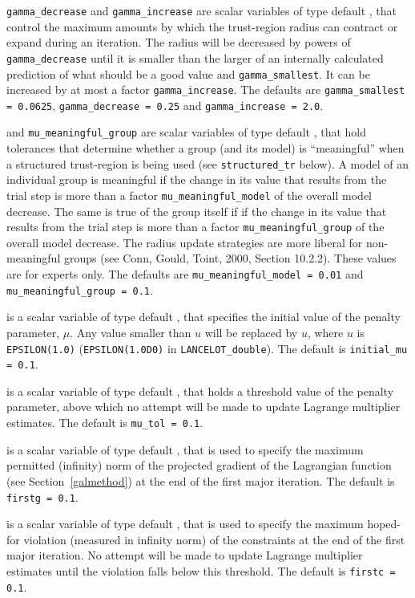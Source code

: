 \documentclass{galahad}
\newcommand{\fullpackagename}{LANC\-E\-LOT}
\begin{document}
\begin{description}
 {\tt gamma\_decrease} and
{\tt gamma\_increase} are scalar variables of type default \realdp, that
control the maximum amounts by which the trust-region radius can
contract or expand during an iteration. The radius will be decreased by
powers of {\tt gamma\_decrease} until it is smaller than the larger
of an internally calculated prediction of what should be a good value
and {\tt gamma\_smallest}. It can be increased by at most a factor
{\tt gamma\_increase}.
The defaults are
{\tt gamma\_smallest = 0.0625},
{\tt gamma\_decrease = 0.25} and
{\tt gamma\_increase = 2.0}.

 and
{\tt mu\_meaningful\_group} are scalar variables of type default \realdp, that
hold tolerances that determine whether a group (and its model)
is ``meaningful'' when a structured trust-region is being used
(see {\tt structured\_tr} below). A model of an individual group
is meaningful if the change in its value
that results from the trial step is more than a factor
{\tt mu\_meaningful\_model} of the overall model decrease. The
same is true of the group itself if if the change in its value
that results from the trial step is more than a factor
{\tt mu\_meaningful\_group} of the overall model decrease.
The radius update strategies are more liberal for non-meaningful
groups (see Conn, Gould, Toint, 2000, Section 10.2.2).
These values are for experts only.
The defaults are
{\tt mu\_meaningful\_model = 0.01} and
{\tt mu\_meaningful\_group = 0.1}.

 is a scalar variable of type default \realdp, that specifies
the initial value of the penalty parameter, $\mu$. Any value smaller than
$u$ will be replaced by $u$,
where $u$ is {\tt EPSILON(1.0)} ({\tt EPSILON(1.0D0)} in
{\tt \fullpackagename\_dou\-ble}).
The default is {\tt initial\_mu = 0.1}.

 is a scalar variable of type default \realdp, that holds a
threshold value of the penalty parameter, above which no attempt will be
made to update Lagrange multiplier estimates.
The default is {\tt mu\_tol = 0.1}.

 is a scalar variable of type default \realdp, that is used to
specify the maximum permitted (infinity)
norm of the projected gradient of the Lagrangian function
(see Section~\ref{galmethod}) at the end of the first major iteration.
The default is {\tt firstg = 0.1}.

 is a scalar variable of type default \realdp, that is used to
specify the maximum hoped-for violation (measured in infinity
norm) of the constraints at the end of the first major iteration.
No attempt will be made to update Lagrange multiplier estimates until the
violation falls below this threshold.
The default is {\tt firstc = 0.1}.


\end{description}
\end{document}
